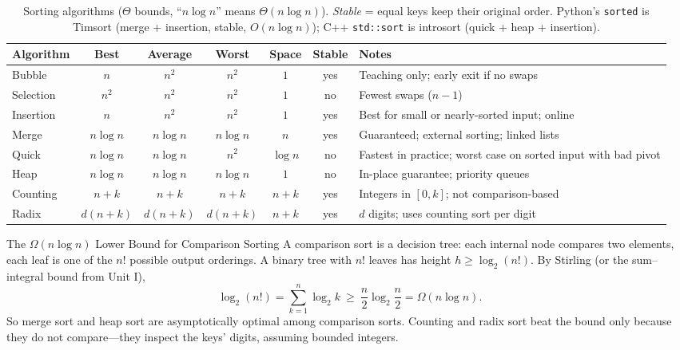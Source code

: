 \documentclass[11pt,a4paper]{article}
\begin{document}
\begin{table}[h!]
\centering
\small
{}
\begin{tabularx}{\textwidth}{|l|c|c|c|c|c|X|}
\hline
\rowcolor{NavyPrimary}\color{white}\textbf{Algorithm} & \color{white}\textbf{Best} & \color{white}\textbf{Average} & \color{white}\textbf{Worst} & \color{white}\textbf{Space} & \color{white}\textbf{Stable} & \color{white}\textbf{Notes} \\ \hline
Bubble & $n$ & $n^2$ & $n^2$ & $1$ & yes & Teaching only; early exit if no swaps \\ \hline
Selection & $n^2$ & $n^2$ & $n^2$ & $1$ & no & Fewest swaps ($n-1$) \\ \hline
Insertion & $n$ & $n^2$ & $n^2$ & $1$ & yes & Best for small or nearly-sorted input; online \\ \hline
Merge & $n\log n$ & $n\log n$ & $n\log n$ & $n$ & yes & Guaranteed; external sorting; linked lists \\ \hline
Quick & $n\log n$ & $n\log n$ & $n^2$ & $\log n$ & no & Fastest in practice; worst case on sorted input with bad pivot \\ \hline
Heap & $n\log n$ & $n\log n$ & $n\log n$ & $1$ & no & In-place guarantee; priority queues \\ \hline
Counting & $n + k$ & $n + k$ & $n+k$ & $n + k$ & yes & Integers in $[0,k]$; not comparison-based \\ \hline
Radix & $d(n+k)$ & $d(n+k)$ & $d(n+k)$ & $n+k$ & yes & $d$ digits; uses counting sort per digit \\ \hline
\end{tabularx}
\caption{Sorting algorithms ($\Theta$ bounds, ``$n\log n$'' means $\Theta(n\log n)$). \emph{Stable} = equal keys keep their original order. Python's \texttt{sorted} is Timsort (merge + insertion, stable, $O(n\log n)$); C++ \texttt{std::sort} is introsort (quick + heap + insertion).}
\end{table}

\begin{formulabox}{The $\Omega(n\log n)$ Lower Bound for Comparison Sorting}
A comparison sort is a decision tree: each internal node compares two elements, each leaf is one of the $n!$ possible output orderings. A binary tree with $n!$ leaves has height $h \ge \log_2 (n!)$. By Stirling (or the sum--integral bound from Unit I),
\[
\log_2(n!) = \sum_{k=1}^n \log_2 k \ \ge\ \frac n2 \log_2 \frac n2 = \Omega(n\log n).
\]
So merge sort and heap sort are asymptotically optimal among comparison sorts. Counting and radix sort beat the bound only because they do not compare---they inspect the keys' digits, assuming bounded integers.
\end{formulabox}
\end{document}
